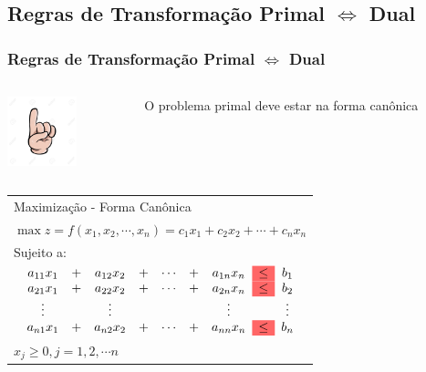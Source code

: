 \documentclass{beamer}
\begin{document}
\subsection{Regras de Transformação Primal $\Leftrightarrow$ Dual}
\begin{frame}
	\frametitle{Regras de Transformação Primal $\Leftrightarrow$ Dual}
	\begin{columns}
		\begin{column}{2cm}
			\includegraphics[width=2cm,height=2cm]{number_1.jpg}
		\end{column}
		\begin{column}{8cm}
			\begin{mdframed}[backgroundcolor=green!70]
				\centering
				O problema primal deve estar na forma canônica
			\end{mdframed}
		\end{column}
	\end{columns}
	{
		\begin{table}
			\begin{tabular}{l}
				\cellcolor{red!60}Maximização - Forma Canônica \\
				$\max z = f(x_1, x_2, \cdots, x_n) = c_1x_1 + c_2x_2 + \cdots + c_nx_n$ \\
				Sujeito a: \\
				$
					\begin{matrix}
						& a_{11}x_1 & + & a_{12}x_2 & + & \cdots & + & a_{1n}x_n & \cellcolor{red!60} \le & b_1 \\
						& a_{21}x_1 & + & a_{22}x_2 & + & \cdots & + & a_{2n}x_n & \cellcolor{red!60} \le & b_2 \\
						& \vdots    &   & \vdots    &   &        &   & \vdots    &     & \vdots \\	
						& a_{n1}x_1 & + & a_{n2}x_2 & + & \cdots & + & a_{nn}x_n & \cellcolor{red!60} \le & b_n \\
					\end{matrix}
				$ \\
				$ x_j \ge 0, j = 1, 2, \cdots n $ \\
			\end{tabular}
		\end{table}
	}
	{
		\begin{table}
			\begin{tabular}{l}

\end{tabular}
\end{table}}
\end{frame}
\end{document}
